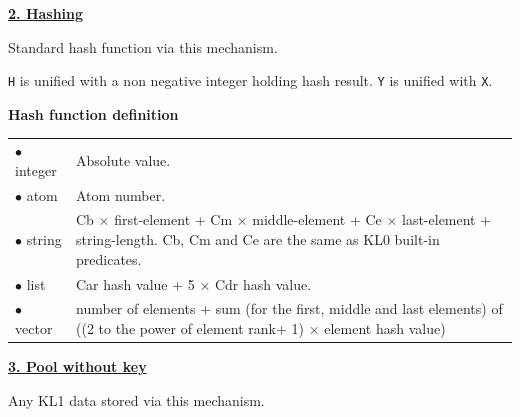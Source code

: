 \noindent\underline{\bf 2. Hashing}\vspace{1ex}\par
{}
Standard hash function via this mechanism.
\begin{itemize}

\verb|H| is unified with a non negative integer holding hash result. \verb|Y|
is unified with \verb|X|.
\vspace{1ex}

{\bf Hash function definition}\\
\hspace*{10mm}\begin{tabular}{l@{$\cdots$}p{120mm}}
$\bullet$ integer   & Absolute value.\\
$\bullet$ atom & Atom number.\\
$\bullet$ string & Cb $\times$ first-element + Cm $\times$ middle-element 
		+ Ce $\times$ last-element + string-length. 
		Cb, Cm and Ce are the same as KL0 built-in predicates.\\
$\bullet$ list & Car hash value + 5 $\times$ Cdr hash value.\\
$\bullet$ vector & number of elements + sum (for the first, middle 
	and last elements) of ((2 to the power of element rank+ 1) 
	$\times$ element hash value)\\
\end{tabular}
\end{itemize}
\vspace{1ex}

\noindent\underline{\bf 3. Pool without key}
\vspace{1ex}\par
Any KL1 data stored via this mechanism.
\vspace{1ex}

